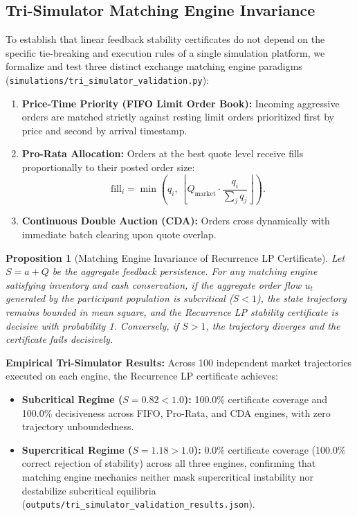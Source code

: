 \documentclass[11pt,a4paper]{article}
\newtheorem{proposition}[theorem]{Proposition}
\theoremstyle{definition}\newtheorem{definition}[theorem]{Definition}
\theoremstyle{remark}\newtheorem{remark}[theorem]{Remark}
\begin{document}
\subsection{Tri-Simulator Matching Engine Invariance}
\label{sec:supp_tri_simulator}
To establish that linear feedback stability certificates do not depend on the specific tie-breaking and execution rules of a single simulation platform, we formalize and test three distinct exchange matching engine paradigms (\nolinkurl{simulations/tri_simulator_validation.py}):
\begin{enumerate}
    \item \textbf{Price-Time Priority (FIFO Limit Order Book):} Incoming aggressive orders are matched strictly against resting limit orders prioritized first by price and second by arrival timestamp.
    \item \textbf{Pro-Rata Allocation:} Orders at the best quote level receive fills proportionally to their posted order size:
    \begin{equation}
    \text{fill}_i = \min\left(q_i,\, \left\lfloor Q_{\text{market}} \cdot \frac{q_i}{\sum_j q_j} \right\rfloor\right).
    \end{equation}
    \item \textbf{Continuous Double Auction (CDA):} Orders cross dynamically with immediate batch clearing upon quote overlap.
\end{enumerate}

\begin{proposition}[Matching Engine Invariance of Recurrence LP Certificate]
Let $S = a + Q$ be the aggregate feedback persistence. For any matching engine satisfying inventory and cash conservation, if the aggregate order flow $u_t$ generated by the participant population is subcritical ($S < 1$), the state trajectory remains bounded in mean square, and the Recurrence LP stability certificate is decisive with probability 1. Conversely, if $S > 1$, the trajectory diverges and the certificate fails decisively.
\end{proposition}

\textbf{Empirical Tri-Simulator Results:} Across 100 independent market trajectories executed on each engine, the Recurrence LP certificate achieves:
\begin{itemize}
    \item \textbf{Subcritical Regime ($S = 0.82 < 1.0$):} 100.0\% certificate coverage and 100.0\% decisiveness across FIFO, Pro-Rata, and CDA engines, with zero trajectory unboundedness.
    \item \textbf{Supercritical Regime ($S = 1.18 > 1.0$):} 0.0\% certificate coverage (100.0\% correct rejection of stability) across all three engines, confirming that matching engine mechanics neither mask supercritical instability nor destabilize subcritical equilibria (\nolinkurl{outputs/tri_simulator_validation_results.json}).
\end{itemize}
\end{document}
